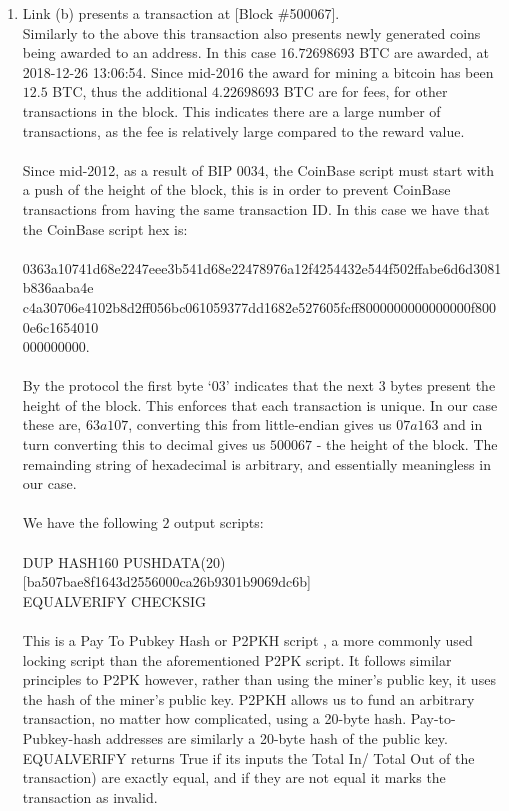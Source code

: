 \documentclass[12pt, a4paper]{article}
\begin{document}
\begin{enumerate}
\begin{enumerate}
\item Link (b) presents a transaction at [Block \#500067].\\
Similarly to the above this transaction also presents newly generated coins being awarded to an address. In this case $16.72698693$ BTC are awarded, at 2018-12-26 13:06:54. Since mid-2016 the award for mining a bitcoin has been $12.5$ BTC, thus the additional $4.22698693$ BTC are for fees, for other transactions in the block. This indicates there are a large number of transactions, as the fee is relatively large compared to the reward value. \\
\\
Since mid-2012, as a result of BIP 0034, the CoinBase script must start with a push of the height of the block, this is in order to prevent CoinBase transactions from having the same transaction ID. In this case we have that the CoinBase script hex is:\\
\\
0363a10741d68e2247eee3b541d68e22478976a12f4254432e544f502ffabe6d6d3081b836aaba4e\\c4a30706e4102b8d2ff056bc061059377dd1682e527605fcff8000000000000000f8000e6c1654010\\000000000.\\ 
\\By the protocol the first byte `03' indicates that the next $3$ bytes present the height of the block. This enforces that each transaction is unique. In our case these are, $63a107$, converting this from little-endian gives us $07a163$ and in turn converting this to decimal gives us $500067$ - the height of the block. The remainding string of hexadecimal is arbitrary, and essentially meaningless in our case.\\
\\
We have the following $2$ output scripts:\\
\\
DUP HASH160 PUSHDATA(20)[ba507bae8f1643d2556000ca26b9301b9069dc6b]\\ EQUALVERIFY CHECKSIG\\
\\
This is a  Pay To Pubkey Hash or P2PKH script , a more commonly used locking script than the aforementioned P2PK script. It follows similar principles to P2PK however, rather than using the miner's public key, it uses the hash of the miner's public key. P2PKH allows us to fund an arbitrary transaction, no matter how complicated, using a 20-byte hash. Pay-to-Pubkey-hash addresses are similarly a 20-byte hash of the public key. EQUALVERIFY returns True if its inputs the Total In/ Total Out of the transaction) are exactly equal, and if they are not equal it marks the transaction as invalid.\\

\end{enumerate}
\end{enumerate}
\end{document}
